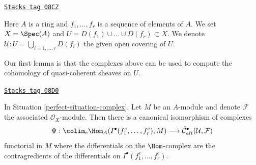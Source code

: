 \begin{definition}
\label{perfect-situation-complex}
\href{https://stacks.math.columbia.edu/tag/08CZ}{\texttt{Stacks tag 08CZ}}

Here $A$ is a ring and $f_1, \ldots, f_r$ is a sequence of elements of $A$.
We set $X = \Spec(A)$ and $U = D(f_1) \cup \ldots \cup D(f_r) \subset X$.
We denote $\mathcal{U} : U = \bigcup_{i = 1, \ldots, r} D(f_i)$ the
given open covering of $U$.
\end{definition}

Our first lemma is that the complexes above can be used to compute
the cohomology of quasi-coherent sheaves on $U$.

\begin{lemma}
\label{perfect-lemma-alternating-cech-complex}
\href{https://stacks.math.columbia.edu/tag/08D0}{\texttt{Stacks tag 08D0}}

In Situation \ref{perfect-situation-complex}. Let $M$ be an $A$-module and
denote $\mathcal{F}$ the associated $\mathcal{O}_X$-module. Then
there is a canonical isomorphism of complexes
$$
\Psi : \colim_e \Hom_A(I^\bullet(f_1^e, \ldots, f_r^e), M)
\longrightarrow
\check{\mathcal{C}}_{alt}^\bullet(\mathcal{U}, \mathcal{F})
$$
functorial in $M$ where the differentials on the $\Hom$-complex
are the contragredients of the differentials on
$I^\bullet(f_1^e, \ldots, f_r^e)$.
\end{lemma}


